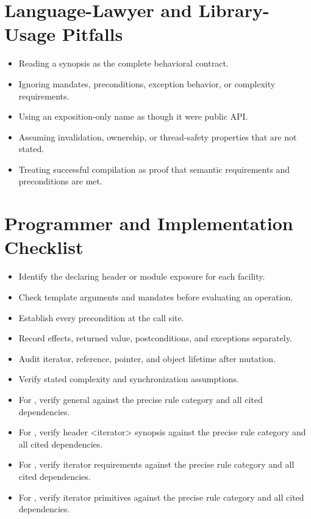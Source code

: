\documentclass[11pt,letterpaper]{article}
\begin{document}
\section{Language-Lawyer and Library-Usage Pitfalls}
\begin{CornellReferencePitfallBox}\begin{itemize}[label=\textcolor{CornellReferenceAmber}{$\blacktriangleright$}]
\item Reading a synopsis as the complete behavioral contract.
\item Ignoring mandates, preconditions, exception behavior, or complexity requirements.
\item Using an exposition-only name as though it were public API.
\item Assuming invalidation, ownership, or thread-safety properties that are not stated.
\item Treating successful compilation as proof that semantic requirements and preconditions are met.
\end{itemize}\end{CornellReferencePitfallBox}
\section{Programmer and Implementation Checklist}
\begin{CornellReferenceChecklistBox}\begin{itemize}[label=$\square$]
\item Identify the declaring header or module exposure for each facility.
\item Check template arguments and mandates before evaluating an operation.
\item Establish every precondition at the call site.
\item Record effects, returned value, postconditions, and exceptions separately.
\item Audit iterator, reference, pointer, and object lifetime after mutation.
\item Verify stated complexity and synchronization assumptions.
\item For , verify general against the precise rule category and all cited dependencies.
\item For , verify header <iterator> synopsis against the precise rule category and all cited dependencies.
\item For , verify iterator requirements against the precise rule category and all cited dependencies.
\item For , verify iterator primitives against the precise rule category and all cited dependencies.
\end{itemize}\end{CornellReferenceChecklistBox}
\end{document}
